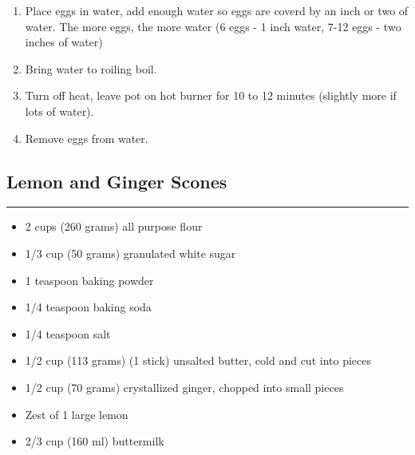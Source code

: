 \documentclass{article}
\begin{document}
\begin{enumerate}
    \item 
        Place eggs in water, add enough water so eggs are coverd by an inch or two of water. The more eggs, the more water (6 eggs - 1 inch water, 7-12 eggs - two inches of water)
    \item 
        Bring water to roiling boil.
    \item 
        Turn off heat, leave pot on hot burner for 10 to 12 minutes (slightly more if lots of water).
    \item 
        Remove eggs from water.
\end{enumerate}
\newpage

\subsection{Lemon and Ginger Scones} 
\noindent\rule[0.5ex]{\linewidth}{1pt}

\begin{framed}
    \begin{itemize}
        \item 2 cups (260 grams) all purpose flour
        \item 1/3 cup (50 grams) granulated white sugar
        \item 1 teaspoon baking powder
        \item 1/4 teaspoon baking soda
        \item 1/4 teaspoon salt
        \item 1/2 cup (113 grams) (1 stick) unsalted butter, cold and cut into pieces
        \item 1/2 cup (70 grams) crystallized ginger, chopped into small pieces
        \item Zest of 1 large lemon
        \item 2/3 cup (160 ml) buttermilk
    \end{itemize}
\end{framed}
\end{document}
